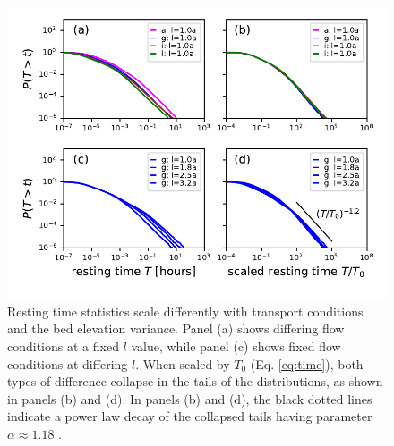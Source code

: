 \begin{figure}[!htbp]
	\includegraphics[width=\linewidth,keepaspectratio]{./figures/ch3/rtcdf.pdf}
	\caption{Resting time statistics scale differently with transport conditions and the bed elevation variance. Panel (a) shows differing flow conditions at a fixed $l$ value, while panel (c) shows fixed flow conditions at differing $l$. When scaled by $T_0$ (Eq. \ref{eq:time}), both types of difference collapse in the tails of the distributions, as shown in panels (b) and (d). In panels (b) and (d), the black dotted lines indicate a power law decay of the collapsed tails having parameter $\alpha\approx1.18$ .}
	\label{fig:cdfs}
\end{figure}

